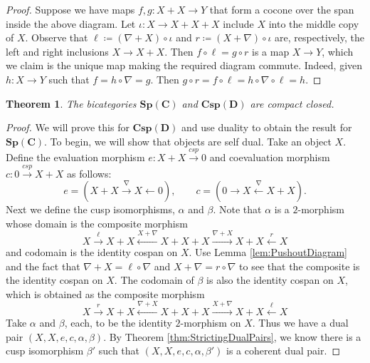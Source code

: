\documentclass[11pt]{amsart}
\newcommand{\from}{\colon}
\newcommand{\xto}[1]{\xrightarrow{#1}}
\newcommand{\tocospan}{\xrightarrow{\mathit{csp}}}
\newcommand{\bispmap}[1]{\mathbf{Sp(#1)}}
\newcommand{\bicspmap}[1]{\mathbf{Csp(#1)}}
\newtheorem{thm}{Theorem}[section]
\theoremstyle{remark}
\theoremstyle{definition}
\begin{document}
\begin{proof}
	Suppose we have maps $f,g \from X+X \to Y$ that form a cocone over the span inside the above diagram. Let $\iota \from X \to X+X+X$ include $X$ into the middle copy of $X$. Observe that $\ell \coloneqq (\nabla + X) \circ \iota$ and $r \coloneqq (X + \nabla) \circ \iota$ are, respectively, the left and right inclusions $X \to X+X$. Then $f \circ \ell = g \circ r$ is a map $X \to Y$, which we claim is the unique map making the required diagram commute. Indeed, given $h \from X \to Y$ such that $f = h \circ \nabla = g$.  Then $g \circ r = f \circ \ell = h \circ \nabla \circ \ell = h$.
\end{proof}

\begin{thm}
	\label{thm:SpansMapsAreCCBicat}
	The bicategories $\bispmap{C}$ and $\bicspmap{D}$ are compact closed.
\end{thm}

\begin{proof}
	We will prove this for $\bicspmap{D}$ and use duality to obtain the result for $\bispmap{C}$. To begin, we will show that objects are self dual. Take an object $X$.  Define the evaluation morphism $e \from X + X \tocospan 0$ and coevaluation morphism $c \from 0 \tocospan X+X$ as follows:
	\[
		e = (X+X \xto{\nabla} X \gets 0), \quad \quad 
		c = (0 \to X \xleftarrow{\nabla} X+X).
	\]
	Next we define the cusp isomorphisms, $\alpha$ and $\beta$.
	Note that $\alpha$ is a $2$-morphism whose domain is the composite morphism
	\[
		X \xto{\ell}
		X+X \xleftarrow{X+\nabla}
		X+X+X \xto{\nabla +X}
		X+X \xleftarrow{r}
		X
	\]
	and codomain is the identity cospan on $X$.  Use Lemma \ref{lem:PushoutDiagram} and the fact that $\nabla+X = \ell \circ \nabla$ and $X + \nabla = r \circ \nabla$ to see that the composite is the identity cospan on $X$.  The codomain of $\beta$ is also the identity cospan on $X$, which is obtained as the composite morphism
	\[
		X \xto{r}
		X+X \xleftarrow{\nabla+X}
		X+X+X \xto{X+\nabla}
		X+X \xleftarrow{\ell}
		X
	\]
	Take $\alpha$ and $\beta$, each, to be the identity $2$-morphism on $X$. Thus we have a dual pair $(X,X,e,c,\alpha,\beta)$. By Theorem \ref{thm:StrictingDualPairs}, we know there is a cusp isomorphism $\beta'$ such that $(X,X,e,c,\alpha,\beta')$ is a coherent dual pair.  
\end{proof}



\end{document}
